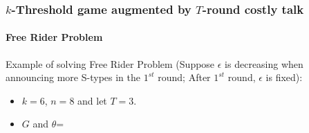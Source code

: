 \documentclass[9pt]{beamer}
\begin{document}
\begin{frame}
  \frametitle{$k$-Threshold game augmented by $T$-round costly talk}
  \framesubtitle{Free Rider Problem}
Example of solving Free Rider Problem (Suppose $\epsilon$ \alert{is decreasing} when announcing \alert{more} S-types in the \alert{$1^{st}$} round;  After $1^{st}$ round, $\epsilon$ is fixed):
\begin{itemize}
\item $k=6$, $n=8$ and let $T=3$.
\item $G$ and $\theta$=
\begin{center}
\end{center}
\end{itemize}


\end{frame}
\end{document}
